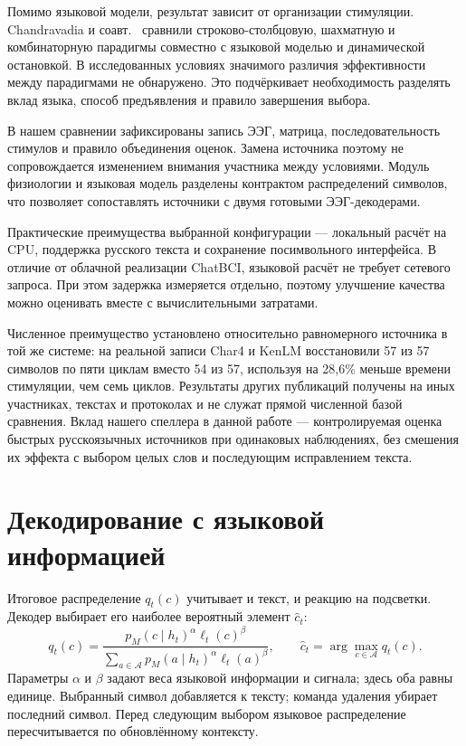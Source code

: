 \documentclass[11pt,a4paper]{article}
\begin{document}
Помимо языковой модели, результат зависит
от организации стимуляции.
Chandravadia и соавт.~\citep{p39899514}
сравнили строково-столбцовую, шахматную
и комбинаторную парадигмы совместно
с языковой моделью и динамической остановкой.
В исследованных условиях значимого различия
эффективности между парадигмами не обнаружено.
Это подчёркивает необходимость разделять
вклад языка, способ предъявления
и правило завершения выбора.

В нашем сравнении зафиксированы запись ЭЭГ,
матрица, последовательность стимулов
и правило объединения оценок.
Замена источника поэтому не сопровождается
изменением внимания участника между условиями.
Модуль физиологии и языковая модель разделены
контрактом распределений символов,
что позволяет сопоставлять источники
с двумя готовыми ЭЭГ-декодерами.

Практические преимущества выбранной конфигурации ---
локальный расчёт на CPU, поддержка русского текста
и сохранение посимвольного интерфейса.
В отличие от облачной реализации ChatBCI,
языковой расчёт не требует сетевого запроса.
При этом задержка измеряется отдельно,
поэтому улучшение качества можно оценивать
вместе с вычислительными затратами.

Численное преимущество установлено относительно
равномерного источника в той же системе:
на реальной записи Char4 и KenLM восстановили
57 из 57 символов по пяти циклам
вместо 54 из 57, используя на 28,6\%
меньше времени стимуляции, чем семь циклов.
Результаты других публикаций получены
на иных участниках, текстах и протоколах
и не служат прямой численной базой сравнения.
Вклад нашего спеллера в данной работе ---
контролируемая оценка быстрых русскоязычных
источников при одинаковых наблюдениях,
без смешения их эффекта с выбором целых слов
и последующим исправлением текста.

\clearpage

\section{Декодирование с языковой информацией}
Итоговое распределение $q_t(c)$ учитывает и текст, и реакцию на подсветки. Декодер выбирает его наиболее вероятный элемент $\hat c_t$:
\begin{equation}\label{eq:bayes}
 q_t(c)=\frac{p_M(c\mid h_t)^\alpha\ell_t(c)^\beta}
 {\sum_{a\in\mathcal A}p_M(a\mid h_t)^\alpha\ell_t(a)^\beta},
 \qquad \hat c_t=\arg\max_{c\in\mathcal A}q_t(c).
\end{equation}
Параметры $\alpha$ и $\beta$ задают веса языковой информации и сигнала; здесь оба равны единице. Выбранный символ добавляется к тексту; команда удаления убирает последний символ. Перед следующим выбором языковое распределение пересчитывается по обновлённому контексту.
\end{document}
